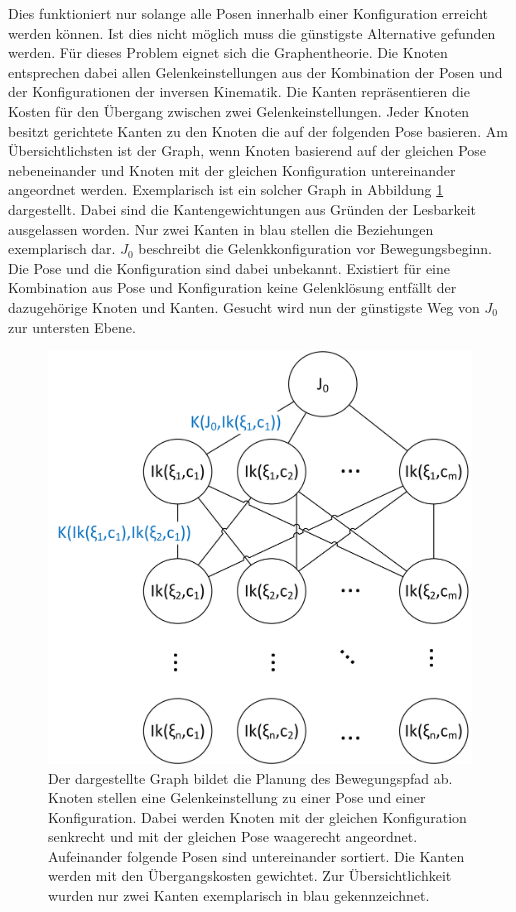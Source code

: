 Dies funktioniert nur solange alle Posen innerhalb einer Konfiguration erreicht werden können. Ist dies nicht möglich muss die günstigste Alternative gefunden werden. Für dieses Problem eignet sich die Graphentheorie. Die Knoten entsprechen dabei allen Gelenkeinstellungen aus der Kombination der Posen und der Konfigurationen der inversen Kinematik. Die Kanten repräsentieren die Kosten für den Übergang zwischen zwei Gelenkeinstellungen. Jeder Knoten besitzt gerichtete Kanten zu den Knoten die auf der folgenden Pose basieren. Am Übersichtlichsten ist der Graph, wenn Knoten basierend auf der gleichen Pose nebeneinander und Knoten mit der gleichen Konfiguration untereinander angeordnet werden. Exemplarisch ist ein solcher Graph in Abbildung \ref{fig:plangraph} dargestellt. Dabei sind die Kantengewichtungen aus Gründen der Lesbarkeit ausgelassen worden. Nur zwei Kanten in blau stellen die Beziehungen exemplarisch dar. $J_0$ beschreibt die Gelenkkonfiguration vor Bewegungsbeginn. Die Pose und die Konfiguration sind dabei unbekannt. Existiert für eine Kombination aus Pose und Konfiguration keine Gelenklösung entfällt der dazugehörige Knoten und Kanten. Gesucht wird nun der günstigste Weg von $J_0$ zur untersten Ebene.

\begin{figure}[h]
	\centering
	\includegraphics[scale=0.8]{fig/graphplan}
	\caption[Graph zur Pfadplanung]{Der dargestellte Graph bildet die Planung des Bewegungspfad ab. Knoten stellen eine Gelenkeinstellung zu einer Pose und einer Konfiguration. Dabei werden Knoten mit der gleichen Konfiguration senkrecht und mit der gleichen Pose waagerecht angeordnet. Aufeinander folgende Posen sind untereinander sortiert. Die Kanten werden mit den Übergangskosten gewichtet. Zur Übersichtlichkeit wurden nur zwei Kanten exemplarisch in blau gekennzeichnet.}
	\label{fig:plangraph}
\end{figure}

